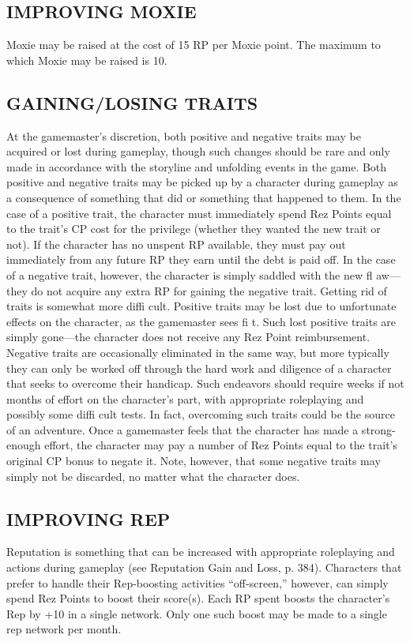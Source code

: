  \subsection{IMPROVING MOXIE}
Moxie may be raised at the cost of 15 RP per
Moxie point. The maximum to which Moxie
may be raised is 10.

 \subsection{GAINING/LOSING TRAITS}
At the gamemaster’s discretion, both positive
and negative traits may be acquired or lost
during gameplay, though such changes should
be rare and only made in accordance with the
storyline and unfolding events in the game.
Both positive and negative traits may be
picked up by a character during gameplay
as a consequence of something that did or
something that happened to them. In the case
of a positive trait, the character must immediately
spend Rez Points equal to the trait’s CP
cost for the privilege (whether they wanted
the new trait or not). If the character has no
unspent RP available, they must pay out immediately
from any future RP they earn until
the debt is paid off. In the case of a negative
trait, however, the character is simply saddled
with the new fl aw—they do not acquire any
extra RP for gaining the negative trait.
Getting rid of traits is somewhat more
diffi cult. Positive traits may be lost due to
unfortunate effects on the character, as the
gamemaster sees fi t. Such lost positive traits
are simply gone—the character does not
receive any Rez Point reimbursement. Negative
traits are occasionally eliminated in the
same way, but more typically they can only
be worked off through the hard work and
diligence of a character that seeks to overcome
their handicap. Such endeavors should
require weeks if not months of effort on the
character’s part, with appropriate roleplaying
and possibly some diffi cult tests. In fact,
overcoming such traits could be the source
of an adventure. Once a gamemaster feels
that the character has made a strong-enough
effort, the character may pay a number of
Rez Points equal to the trait’s original CP
bonus to negate it. Note, however, that some
negative traits may simply not be discarded,
no matter what the character does.

 \subsection{IMPROVING REP}
Reputation is something that can be increased
with appropriate roleplaying and
actions during gameplay (see Reputation
Gain and Loss, p. 384). Characters that
prefer to handle their Rep-boosting activities
“off-screen,” however, can simply spend Rez
Points to boost their score(s). Each RP spent
boosts the character’s Rep by +10 in a single
network. Only one such boost may be made
to a single rep network per month.

